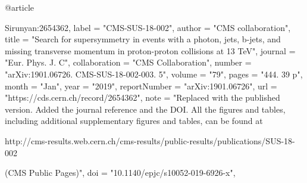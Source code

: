 @article{Sirunyan:2654362,
      label          = "CMS-SUS-18-002",
      author        = "{CMS collaboration}",
      title         = "{Search for supersymmetry in events with a photon, jets,
                       b-jets, and missing transverse momentum in proton-proton
                       collisions at 13 TeV}",
      journal       = "Eur. Phys. J. C",
      collaboration = "CMS Collaboration",
      number        = "arXiv:1901.06726. CMS-SUS-18-002-003. 5",
      volume        = "79",
      pages         = "444. 39 p",
      month         = "Jan",
      year          = "2019",
      reportNumber  = "arXiv:1901.06726",
      url           = "https://cds.cern.ch/record/2654362",
      note          = "Replaced with the published version. Added the journal
                       reference and
  the DOI. All the figures and tables,
                       including additional supplementary
  figures and tables,
                       can be found at
 
                       http://cms-results.web.cern.ch/cms-results/public-results/publications/SUS-18-002

                        (CMS Public Pages)",
      doi           = "10.1140/epjc/s10052-019-6926-x",
}

